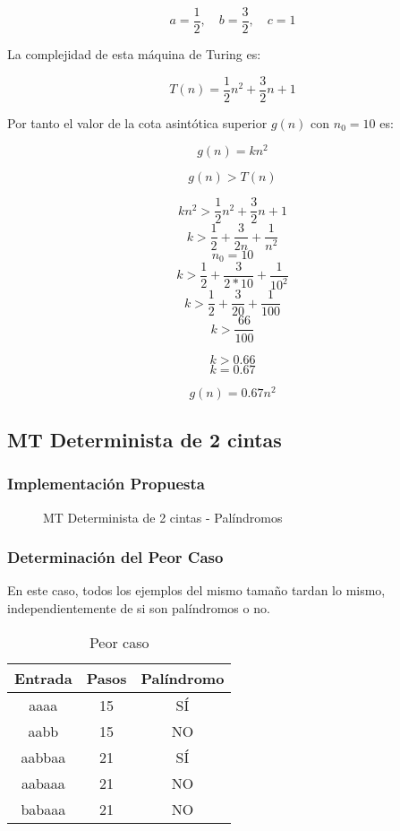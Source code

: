 \documentclass{uc3mpracticas}
\begin{document}
  $$ a = \frac{1}{2} ,\quad b = \frac{3}{2} ,\quad c = 1 $$

  La complejidad de esta máquina de Turing es:

  $$ T(n) = \frac{1}{2}n^2 + \frac{3}{2}n + 1 $$

  Por tanto el valor de la cota asintótica superior $g(n)$ con $n_0 = 10$ es:

  $$ g(n) = kn^2 $$

  $$ g(n) > T(n) $$

  $$ kn^2 > \frac{1}{2}n^2 + \frac{3}{2}n + 1 $$
  $$ k > \frac{1}{2} + \frac{3}{2n} + \frac{1}{n^2}$$
  $$ n_0 = 10 $$
  $$ k > \frac{1}{2} + \frac{3}{2 * 10} + \frac{1}{10^2}$$
  $$ k > \frac{1}{2} + \frac{3}{20} + \frac{1}{100}$$
  $$ k > \frac{66}{100}$$

  $$ k > 0.66 $$
  $$ k = 0.67 $$

  $$ g(n) = 0.67n^2 $$






  \subsection{MT Determinista de 2 cintas}

  \subsubsection{Implementación Propuesta}


  \begin{figure}[!h]
    \caption{MT Determinista de 2 cintas - Palíndromos}
  \end{figure}


  \subsubsection{Determinación del Peor Caso}

  En este caso, todos los ejemplos del mismo tamaño tardan lo mismo, independientemente de si son palíndromos o no.


  \begin{table}[!h]
    \centering
  \begin{tabular}{|c|c|c|}
  \hline

  \textbf{Entrada} & \textbf{Pasos} & \textbf{Palíndromo} \\ \hline

  aaaa             & 15             & SÍ                  \\ \hline
  aabb             & 15             & NO                  \\ \hline
  aabbaa           & 21             & SÍ                  \\ \hline
  aabaaa           & 21             & NO                  \\ \hline
  babaaa           & 21             & NO                  \\ \hline
  \end{tabular}
  \caption{Peor caso}
  \end{table}
\end{document}
